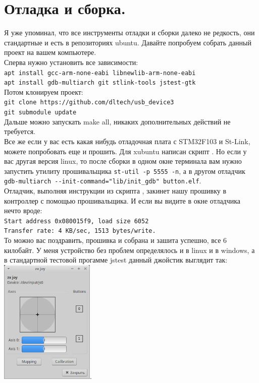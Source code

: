 \documentclass[12pt,a4paper]{article}
\begin{document}
\section{Отладка и сборка.}
    Я уже упоминал, что все инструменты отладки и сборки далеко не редкость,
    они стандартные и есть в репозиториях ubuntu. Давайте попробуем собрать
    данный проект на вашем компьютере.\\
    Сперва нужно установить все зависимости:\\
    \lstset{language=bash}
    \lstinline{apt install gcc-arm-none-eabi libnewlib-arm-none-eabi}\\
    \lstinline{apt install gdb-multiarch git stlink-tools jstest-gtk}\\
    Потом клонируем проект:\\
    \lstinline{git clone https://github.com/dltech/usb_device3}\\
    \lstinline{git submodule update}\\
    Дальше можно запускать make all, никаких дополнительных действий не
    требуется.\\
    Все же если у вас есть какая нибудь отладочная плата с STM32F103 и St-Link,
    можете попробовать еще и прошить. Для xubuntu написан скрипт .
    Но если у вас другая версия linux, то после сборки в одном окне терминала
    вам нужно запустить утилиту прошивальщика \lstinline{st-util -p 5555 -n},
    а в другом отладчик\\
    \lstinline{gdb-multiarch --init-command="lib/init_gdb" button.elf}.\\
    Отладчик, выполняя инструкции из скрипта , закинет
    нашу прошивку в контроллер с помощью прошивальщика. И если вы видите
	в окне отладчика нечто вроде:\\
	\lstinline{Start address 0x080015f9, load size 6052}\\
	\lstinline{Transfer rate: 4 KB/sec, 1513 bytes/write.}\\
	То можно вас поздравить, прошивка и собрана и зашита успешно, все 6 килобайт.
	У меня устройство без проблем определялось и в linux и в windows,
	а в стандартной тестовой прогамме jstest данный джойстик выглядит так:\\
	\includegraphics[width=4.5cm]{test.png}.
\end{document}
